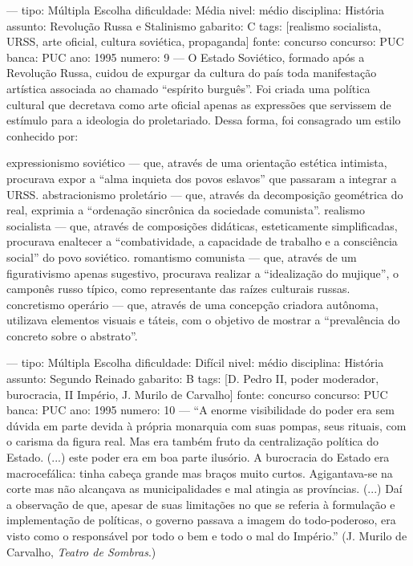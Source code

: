 ---
tipo: Múltipla Escolha
dificuldade: Média
nivel: médio
disciplina: História
assunto: Revolução Russa e Stalinismo
gabarito: C
tags: [realismo socialista, URSS, arte oficial, cultura soviética, propaganda]
fonte: concurso
concurso: PUC
banca: PUC
ano: 1995
numero: 9
---
\question
O Estado Soviético, formado após a Revolução Russa, cuidou de expurgar da cultura do país toda manifestação artística associada ao chamado ``espírito burguês''. Foi criada uma política cultural que decretava como arte oficial apenas as expressões que servissem de estímulo para a ideologia do proletariado. Dessa forma, foi consagrado um estilo conhecido por:
\begin{choices}
\choice expressionismo soviético --- que, através de uma orientação estética intimista, procurava expor a ``alma inquieta dos povos eslavos'' que passaram a integrar a URSS.
\choice abstracionismo proletário --- que, através da decomposição geométrica do real, exprimia a ``ordenação sincrônica da sociedade comunista''.
\CorrectChoice realismo socialista --- que, através de composições didáticas, esteticamente simplificadas, procurava enaltecer a ``combatividade, a capacidade de trabalho e a consciência social'' do povo soviético.
\choice romantismo comunista --- que, através de um figurativismo apenas sugestivo, procurava realizar a ``idealização do mujique'', o camponês russo típico, como representante das raízes culturais russas.
\choice concretismo operário --- que, através de uma concepção criadora autônoma, utilizava elementos visuais e táteis, com o objetivo de mostrar a ``prevalência do concreto sobre o abstrato''.
\end{choices}

---
tipo: Múltipla Escolha
dificuldade: Difícil
nivel: médio
disciplina: História
assunto: Segundo Reinado
gabarito: B
tags: [D. Pedro II, poder moderador, burocracia, II Império, J. Murilo de Carvalho]
fonte: concurso
concurso: PUC
banca: PUC
ano: 1995
numero: 10
---
\question
``A enorme visibilidade do poder era sem dúvida em parte devida à própria monarquia com suas pompas, seus rituais, com o carisma da figura real. Mas era também fruto da centralização política do Estado. (...) este poder era em boa parte ilusório. A burocracia do Estado era macrocefálica: tinha cabeça grande mas braços muito curtos. Agigantava-se na corte mas não alcançava as municipalidades e mal atingia as províncias. (...) Daí a observação de que, apesar de suas limitações no que se referia à formulação e implementação de políticas, o governo passava a imagem do todo-poderoso, era visto como o responsável por todo o bem e todo o mal do Império.'' (J. Murilo de Carvalho, \textit{Teatro de Sombras}.)

